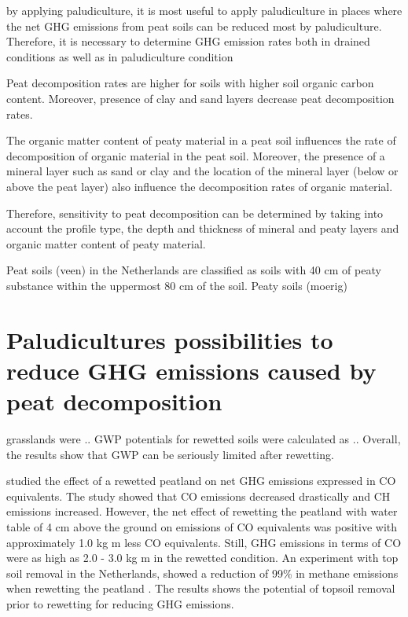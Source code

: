{\begin{enumerate}
by applying paludiculture, it is most useful to apply paludiculture in places where the net GHG emissions from peat soils can be reduced most by paludiculture. Therefore, it is necessary to determine GHG emission rates both in drained conditions as well as in paludiculture condition


Peat decomposition rates are higher for soils with higher soil organic carbon content. Moreover, presence of clay and sand layers decrease peat decomposition rates. 

The organic matter content of peaty material in a peat soil influences the rate of decomposition of organic material in the peat soil. Moreover, the presence of a mineral layer such as sand or clay and the location of the mineral layer (below or above the peat layer) also influence the decomposition rates of organic material. 

Therefore, sensitivity to peat decomposition can be determined by taking into account the profile type, the depth and thickness of mineral and peaty layers and organic matter content of peaty material. 

Peat soils (veen) in the Netherlands are classified as soils with 40 cm of peaty substance within the uppermost 80 cm of the soil. Peaty soils (moerig) 


\section{Paludicultures possibilities to reduce GHG emissions caused by peat decomposition}

 grasslands were .. GWP potentials for rewetted soils were calculated as .. Overall, the results show that GWP can be seriously limited after rewetting. 
 

\citet{van2013rewetting} studied the effect of a rewetted peatland on net GHG emissions expressed in CO equivalents. The study showed that CO emissions decreased drastically and CH emissions increased. However, the net effect of rewetting the peatland with water table of 4 cm above the ground on emissions of CO equivalents was positive with approximately 1.0 kg m less CO equivalents. Still, GHG emissions in terms of CO were as high as 2.0 - 3.0 kg m in the rewetted condition. An experiment with top soil removal in the Netherlands, showed a reduction of 99\% in methane emissions when rewetting the peatland \citep{harpenslager2015rewetting}. The results shows the potential of topsoil removal prior to rewetting for reducing GHG emissions. 


\end{enumerate}}
